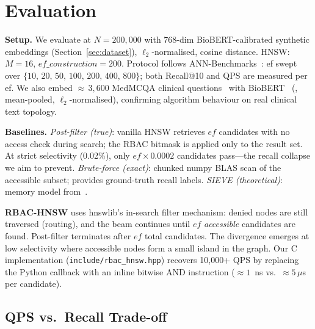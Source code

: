 \section{Evaluation}
\label{sec:eval}

\noindent\textbf{Setup.}
We evaluate at $N\!=\!200{,}000$ with 768-dim BioBERT-calibrated synthetic
embeddings (Section~\ref{sec:dataset}), $\ell_2$-normalised, cosine distance.
HNSW: $M\!=\!16$, $\mathit{ef\_construction}\!=\!200$.
Protocol follows ANN-Benchmarks~\cite{aumuller2020ann}:
ef swept over $\{10,\,20,\,50,\,100,\,200,\,400,\,800\}$;
both Recall@10 and QPS are measured per ef.
We also embed ${\approx}\,3{,}600$ MedMCQA clinical questions~\cite{medmcqa}
with BioBERT~\cite{lee2020biobert} (, mean-pooled,
$\ell_2$-normalised), confirming algorithm behaviour on real clinical text topology.

\smallskip
\noindent\textbf{Baselines.}
\emph{Post-filter (true)}: vanilla HNSW retrieves $\mathit{ef}$ candidates
with no access check during search; the RBAC bitmask is applied only to the
result set.
At strict selectivity (0.02\%), only $\mathit{ef}\!\times\!0.0002$ candidates
pass---the recall collapse we aim to prevent.
\emph{Brute-force (exact)}: chunked numpy BLAS scan of the accessible subset;
provides ground-truth recall labels.
\emph{SIEVE (theoretical)}: memory model from~\cite{zhang2025sieve}.

\smallskip
\noindent\textbf{RBAC-HNSW} uses hnswlib's in-search filter mechanism:
denied nodes are still traversed (routing), and the beam continues until
$\mathit{ef}$ \emph{accessible} candidates are found.
Post-filter terminates after $\mathit{ef}$ total candidates.
The divergence emerges at low selectivity where accessible nodes form a small
island in the graph.
Our C\nolinebreak\hspace{-.05em}\raisebox{.4ex}{\tiny\bf +}\nolinebreak\hspace{-.05em}\raisebox{.4ex}{\tiny\bf +}
implementation (\texttt{include/rbac\_hnsw.hpp}) recovers 10{,}000+ QPS by
replacing the Python callback with an inline bitwise AND instruction
(${\approx}1$~ns vs.\ ${\approx}5\,\mu$s per candidate).

\subsection{QPS vs.\ Recall Trade-off}
\label{sec:qpsrecall}

